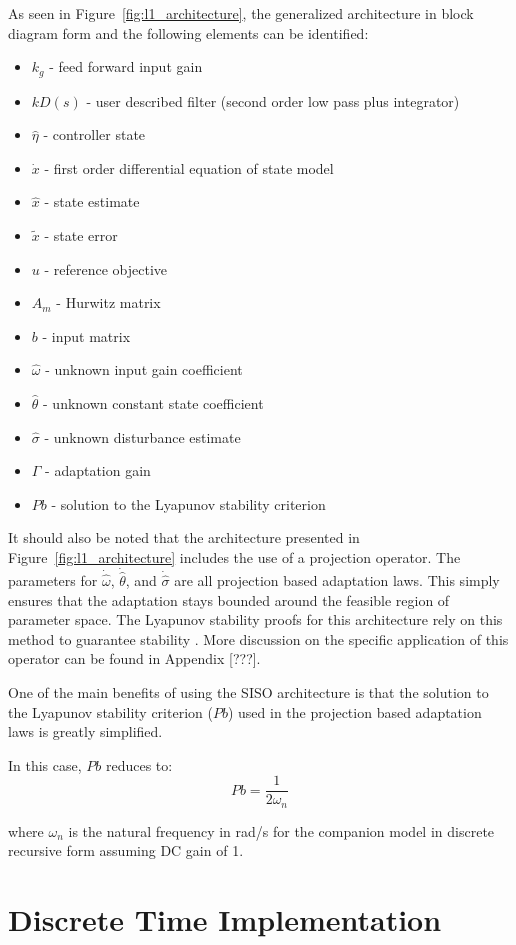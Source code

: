 As seen in Figure~\ref{fig:l1_architecture}, the generalized \Lone architecture in block diagram form and the following elements can be identified:
\begin{itemize}
	\item[] $k_g$ - feed forward input gain
	\item[] $kD(s)$ - user described filter (second order low pass plus integrator)
	\item[] $\hat{\eta}$ - \Lone controller state
	\item[] $\dot{x}$ - first order differential equation of state model
	\item[] $\hat{x}$ - state estimate
	\item[] $\tilde{x}$ - state error
	\item[] $u$ - reference objective
	\item[] $A_m$ - Hurwitz matrix
	\item[] $b$ - input matrix
	\item[] $\hat{\omega}$ - unknown input gain coefficient
	\item[] $\hat{\theta}$ - unknown constant state coefficient
	\item[] $\hat{\sigma}$ - unknown disturbance estimate
	\item[] $\Gamma$ - adaptation gain
	\item[] $Pb$ - solution to the Lyapunov stability criterion	
\end{itemize}

It should also be noted that the architecture presented in Figure~\ref{fig:l1_architecture} includes the use of a projection operator.  The parameters for $\dot{\hat{\omega}}$, $\dot{\hat{\theta}}$, and $\dot{\hat{\sigma}}$ are all projection based adaptation laws.  This simply ensures that the adaptation stays bounded around the feasible region of parameter space.  The Lyapunov stability proofs for this architecture rely on this method to guarantee stability\cite{hovakimyan2010l1} .  More discussion on the specific application of this operator can be found in Appendix [???].

One of the main benefits of using the \ac{SISO} architecture is that the solution to the Lyapunov stability criterion ($Pb$) used in the projection based adaptation laws is greatly simplified.  

In this case, $Pb$ reduces to:
\begin{equation}
Pb = \frac{1}{2\omega_n}
\end{equation}

where $\omega_n$ is the natural frequency in rad/s for the companion model in discrete recursive form assuming DC gain of 1. 


\section{\Lone Discrete Time Implementation}







